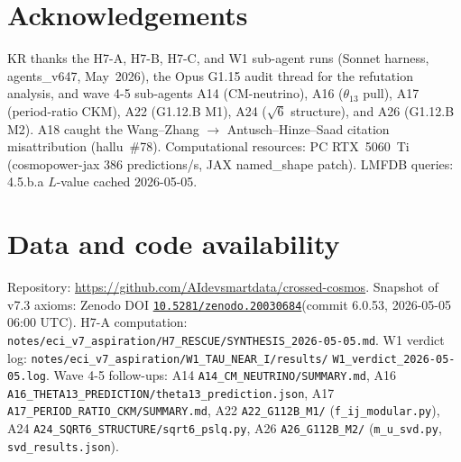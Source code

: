 \documentclass[a4paper,11pt]{article}
\newcommand{\Zeno}{\href{https://doi.org/10.5281/zenodo.20030684}{\texttt{10.5281/zenodo.20030684}}}
\theoremstyle{definition}
\theoremstyle{remark}
\begin{document}
\section*{Acknowledgements}

KR thanks the H7-A, H7-B, H7-C, and W1 sub-agent runs (Sonnet harness,
agents\_v647, May~2026), the Opus G1.15 audit thread for the
refutation analysis, and wave 4-5 sub-agents A14 (CM-neutrino),
A16 ($\theta_{13}$ pull), A17 (period-ratio CKM), A22 (G1.12.B M1),
A24 ($\sqrt 6$ structure), and A26 (G1.12.B M2).  A18 caught the
Wang--Zhang $\to$ Antusch--Hinze--Saad citation misattribution
(hallu~\#78).  Computational resources: PC RTX~5060~Ti
(cosmopower-jax 386 predictions/s, JAX named\_shape patch).
LMFDB queries: 4.5.b.a $L$-value cached 2026-05-05.

\section*{Data and code availability}

Repository: \url{https://github.com/AIdevsmartdata/crossed-cosmos}.
Snapshot of v7.3 axioms: Zenodo DOI \Zeno (commit 6.0.53, 2026-05-05
06:00 UTC).  H7-A computation:
\texttt{notes/eci\_v7\_aspiration/H7\_RESCUE/SYNTHESIS\_2026-05-05.md}.
W1 verdict log:
\texttt{notes/eci\_v7\_aspiration/W1\_TAU\_NEAR\_I/results/}
\texttt{W1\_verdict\_2026-05-05.log}.
Wave 4-5 follow-ups:
A14 \texttt{A14\_CM\_NEUTRINO/SUMMARY.md},
A16 \texttt{A16\_THETA13\_PREDICTION/theta13\_prediction.json},
A17 \texttt{A17\_PERIOD\_RATIO\_CKM/SUMMARY.md},
A22 \texttt{A22\_G112B\_M1/} (\texttt{f\_ij\_modular.py}),
A24 \texttt{A24\_SQRT6\_STRUCTURE/sqrt6\_pslq.py},
A26 \texttt{A26\_G112B\_M2/} (\texttt{m\_u\_svd.py},
\texttt{svd\_results.json}).
\end{document}

